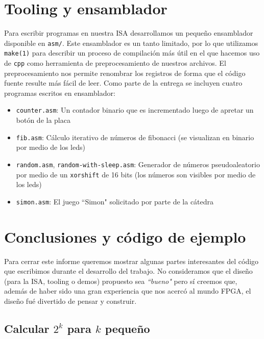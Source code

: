\documentclass{article}
\begin{document}
\section{Tooling y ensamblador}
Para escribir programas en nuestra ISA desarrollamos un pequeño ensamblador disponible en \texttt{asm/}. Este ensamblador es un tanto limitado, por lo que utilizamos \texttt{make(1)} para describir un proceso de compilación más útil en el que hacemos uso de \texttt{cpp} como herramienta de preprocesamiento de nuestros archivos. El preprocesamiento nos permite renombrar los registros de forma que el código fuente resulte más fácil de leer.
Como parte de la entrega se incluyen cuatro programas escritos en ensamblador:
\begin{itemize}
    \item \texttt{counter.asm}: Un contador binario que es incrementado luego de apretar un botón de la placa
    \item \texttt{fib.asm}: Cálculo iterativo de números de fibonacci (se visualizan en binario por medio de los leds)
    \item \texttt{random.asm}, \texttt{random-with-sleep.asm}: Generador de números pseudoaleatorio por medio de un \texttt{xorshift} de 16 bits (los números son visibles por medio de los leds)
    \item \texttt{simon.asm}: El juego ``Simon" solicitado por parte de la cátedra
\end{itemize}

\section{Conclusiones y código de ejemplo}

Para cerrar este informe queremos mostrar algunas partes interesantes del código que escribimos durante el desarrollo del trabajo. No consideramos que el diseño (para la ISA, tooling o demos) propuesto sea \emph{``bueno"} pero sí creemos que, además de haber sido una gran experiencia que nos acercó al mundo FPGA, el diseño fué divertido de pensar y construir.

\subsection{Calcular $2^k$ para $k$ pequeño}
\end{document}
